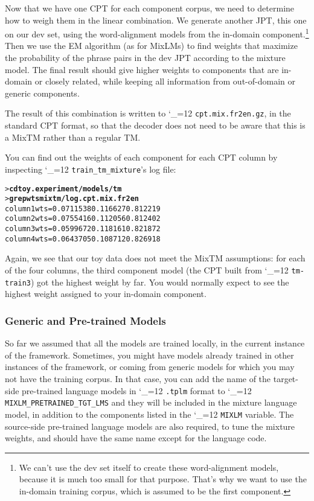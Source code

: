 \documentclass[11pt,letterpaper]{article}
\def\code{\begingroup\catcode`\_=12 \codex}
\newcommand{\codex}[1]{\texttt{#1}\endgroup}
\begin{document}
Now that we have one CPT for each component corpus, we need to determine how to
weigh them in the linear combination.  We generate another JPT, this one on our
dev set, using the word-alignment models from the in-domain
component.\footnote{We can't use the dev set itself to create these
word-alignment models, because it is much too small for that purpose.  That's
why we want to use the in-domain training corpus, which is assumed to be the
first component.}  Then we use the EM
algorithm (as for MixLMs) to find weights that maximize the probability of the
phrase pairs in the dev JPT according to the mixture model.  The final result
should give higher weights to components that are in-domain or closely related,
while keeping all information from out-of-domain or generic components.

The result of this combination is written to \code{cpt.mix.fr2en.gz}, in
the standard CPT format, so that the decoder does not need to be aware that
this is a MixTM rather than a regular TM.

You can find out the weights of each component for each CPT column by
inspecting \code{train_tm_mixture}'s log file:
\begin{small}
\begin{alltt}
   > \textbf{cd toy.experiment/models/tm}
   > \textbf{grep wts mixtm/log.cpt.mix.fr2en}
   column 1 wts = 0.0711538 0.116627 0.812219
   column 2 wts = 0.0755416 0.112056 0.812402
   column 3 wts = 0.0599672 0.118161 0.821872
   column 4 wts = 0.0643705 0.108712 0.826918
\end{alltt}
\end{small}

Again, we see that our toy data does not meet the MixTM assumptions: for each
of the four columns, the third component model (the CPT built from
\code{tm-train3}) got the highest weight by far. You would normally expect to
see the highest weight assigned to your in-domain component.

\subsubsection{Generic and Pre-trained Models} \label{Generic}

So far we assumed that all the models are trained locally, in the current
instance of the framework.  Sometimes, you might have models already trained in
other instances of the framework, or coming from generic models for which you
may not have the training corpus.  In that case, you can add the name of the
target-side pre-trained language models in \code{.tplm} format to
\code{MIXLM_PRETRAINED_TGT_LMS} and they will be included in the mixture
language model, in addition to the components listed in the \code{MIXLM}
variable.  The source-side pre-trained language models are also required,
to tune the mixture weights, and should have the same name except for the
language code.
\end{document}
